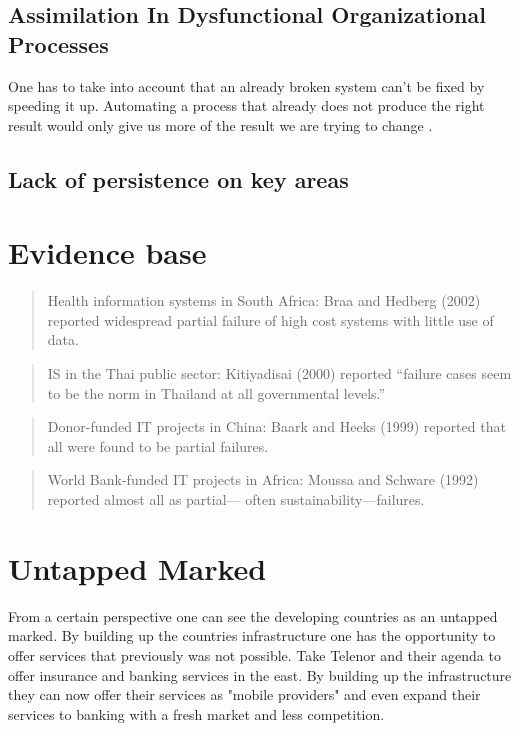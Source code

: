 \subsection{Assimilation In Dysfunctional Organizational Processes}
One has to take into account that an already broken system can't be fixed by speeding it up.
Automating a process that already does not produce the right result would only give us more of the result we are trying to change \cite{mh:rw}.









\subsection{Lack of persistence on key areas}







\section{Evidence base}

\begin{quotation}
Health information systems in South Africa: Braa
and Hedberg (2002) reported widespread partial
failure of high cost systems with little use of data.\cite{rh:isdc}
\end{quotation}

\begin{quotation}
IS in the Thai public sector: Kitiyadisai (2000)
reported “failure cases seem to be the norm in
Thailand at all governmental levels.”\cite{rh:isdc}
\end{quotation}

\begin{quotation}
Donor-funded IT projects in China: Baark and
Heeks (1999) reported that all were found to be
partial failures.\cite{rh:isdc}
\end{quotation}

\begin{quotation}
World Bank-funded IT projects in Africa: Moussa
and Schware (1992) reported almost all as partial—
often sustainability—failures.\cite{rh:isdc}
\end{quotation}

\section{Untapped Marked}
From a certain perspective one can see the developing countries as an untapped marked.
By building up the countries infrastructure one has the opportunity to offer services that previously was not possible.
Take Telenor and their agenda to offer insurance and banking services in the east.
By building up the infrastructure they can now offer their services as "mobile providers" and even expand their services to banking with a fresh market and less competition.


